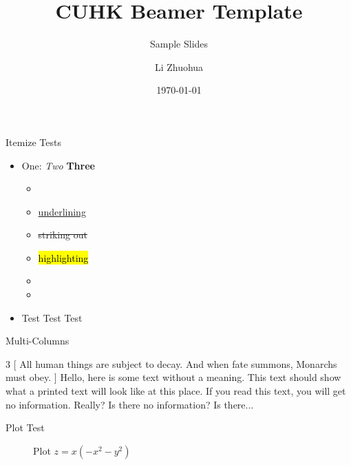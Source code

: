 

\title[Sample]{CUHK Beamer Template}
\subtitle{Sample Slides}
\author[Li Zhuohua]{Li Zhuohua}
\date{\today}



\frame[plain]{\maketitle}


\begin{frame}{Itemize Tests}
	\begin{itemize}
		\item One: \textit{Two} \textbf{Three}
      \begin{itemize}
        \item {}
        \item \ul{underlining}
        \item \st{striking out}
        \item \hl{highlighting}
        \item {}
        \item {}
      \end{itemize}
		\item Test Test Test
	\end{itemize}
\end{frame}

\begin{frame}{Multi-Columns}
	\begin{multicols}{3}
    [
    All human things are subject to decay. And when fate summons, Monarchs must obey.
    ]
    Hello, here is some text without a meaning.  This text should show what 
    a printed text will look like at this place.
    If you read this text, you will get no information.  Really?  Is there 
    no information?  Is there...
    \end{multicols}
\end{frame}

\begin{frame}{Plot Test}
    \pgfplotsset{width=5.5cm,compat=1.9}
    \begin{figure}
        \centering
        \caption{Plot $z=x(-x^2-y^2)$} \label{fig:plot}
    \end{figure}
\end{frame}

